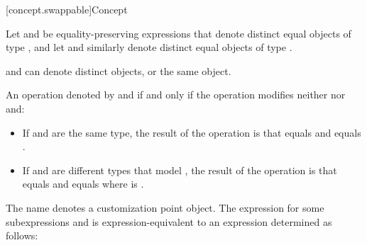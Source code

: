 [concept.swappable]{Concept }

\pnum
Let  and  be equality-preserving expressions that denote
distinct equal objects of type , and let  and 
similarly denote distinct equal objects of type .
\begin{note}
 and  can denote distinct objects, or the same object.
\end{note}
An operation
 denoted by  and  if and only
if the operation modifies neither  nor  and:
\begin{itemize}
\item If  and  are the same type, the result of the operation
  is that  equals  and  equals .

\item If  and  are different types that model
  ,
  the result of the operation is that
   equals 
  and
   equals 
  where  is .
\end{itemize}

\pnum
{}%
The name  denotes a customization point
object. The expression
 for some subexpressions 
and  is expression-equivalent to an expression
 determined as follows:

